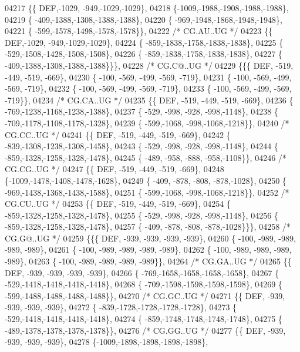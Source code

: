 \begin{DoxyCode}
04217 \{\{  DEF,-1029, -949,-1029,-1029\},
04218 \{-1009,-1988,-1908,-1988,-1988\},
04219 \{ -409,-1388,-1308,-1388,-1388\},
04220 \{ -969,-1948,-1868,-1948,-1948\},
04221 \{ -599,-1578,-1498,-1578,-1578\}\},
04222 \textcolor{comment}{/* CG.AU..UG */}
04223 \{\{  DEF,-1029, -949,-1029,-1029\},
04224 \{ -859,-1838,-1758,-1838,-1838\},
04225 \{ -529,-1508,-1428,-1508,-1508\},
04226 \{ -859,-1838,-1758,-1838,-1838\},
04227 \{ -409,-1388,-1308,-1388,-1388\}\}\},
04228 \textcolor{comment}{/* CG.C@..UG */}
04229 \{\{\{  DEF, -519, -449, -519, -669\},
04230 \{ -100, -569, -499, -569, -719\},
04231 \{ -100, -569, -499, -569, -719\},
04232 \{ -100, -569, -499, -569, -719\},
04233 \{ -100, -569, -499, -569, -719\}\},
04234 \textcolor{comment}{/* CG.CA..UG */}
04235 \{\{  DEF, -519, -449, -519, -669\},
04236 \{ -769,-1238,-1168,-1238,-1388\},
04237 \{ -529, -998, -928, -998,-1148\},
04238 \{ -709,-1178,-1108,-1178,-1328\},
04239 \{ -599,-1068, -998,-1068,-1218\}\},
04240 \textcolor{comment}{/* CG.CC..UG */}
04241 \{\{  DEF, -519, -449, -519, -669\},
04242 \{ -839,-1308,-1238,-1308,-1458\},
04243 \{ -529, -998, -928, -998,-1148\},
04244 \{ -859,-1328,-1258,-1328,-1478\},
04245 \{ -489, -958, -888, -958,-1108\}\},
04246 \textcolor{comment}{/* CG.CG..UG */}
04247 \{\{  DEF, -519, -449, -519, -669\},
04248 \{-1009,-1478,-1408,-1478,-1628\},
04249 \{ -409, -878, -808, -878,-1028\},
04250 \{ -969,-1438,-1368,-1438,-1588\},
04251 \{ -599,-1068, -998,-1068,-1218\}\},
04252 \textcolor{comment}{/* CG.CU..UG */}
04253 \{\{  DEF, -519, -449, -519, -669\},
04254 \{ -859,-1328,-1258,-1328,-1478\},
04255 \{ -529, -998, -928, -998,-1148\},
04256 \{ -859,-1328,-1258,-1328,-1478\},
04257 \{ -409, -878, -808, -878,-1028\}\}\},
04258 \textcolor{comment}{/* CG.G@..UG */}
04259 \{\{\{  DEF, -939, -939, -939, -939\},
04260 \{ -100, -989, -989, -989, -989\},
04261 \{ -100, -989, -989, -989, -989\},
04262 \{ -100, -989, -989, -989, -989\},
04263 \{ -100, -989, -989, -989, -989\}\},
04264 \textcolor{comment}{/* CG.GA..UG */}
04265 \{\{  DEF, -939, -939, -939, -939\},
04266 \{ -769,-1658,-1658,-1658,-1658\},
04267 \{ -529,-1418,-1418,-1418,-1418\},
04268 \{ -709,-1598,-1598,-1598,-1598\},
04269 \{ -599,-1488,-1488,-1488,-1488\}\},
04270 \textcolor{comment}{/* CG.GC..UG */}
04271 \{\{  DEF, -939, -939, -939, -939\},
04272 \{ -839,-1728,-1728,-1728,-1728\},
04273 \{ -529,-1418,-1418,-1418,-1418\},
04274 \{ -859,-1748,-1748,-1748,-1748\},
04275 \{ -489,-1378,-1378,-1378,-1378\}\},
04276 \textcolor{comment}{/* CG.GG..UG */}
04277 \{\{  DEF, -939, -939, -939, -939\},
04278 \{-1009,-1898,-1898,-1898,-1898\},

\end{DoxyCode}
